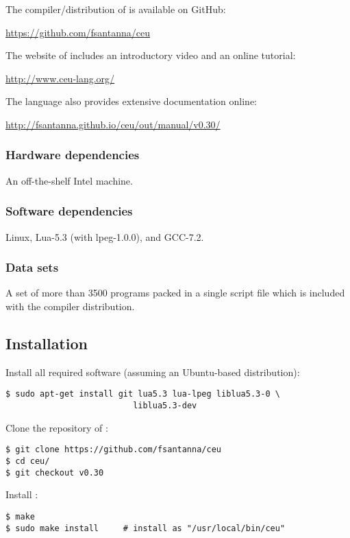 {The compiler/distribution of \CEU is available on GitHub:

\url{https://github.com/fsantanna/ceu}

The website of \CEU includes an introductory video and an online tutorial:

\url{http://www.ceu-lang.org/}

The language also provides extensive documentation online:

\url{http://fsantanna.github.io/ceu/out/manual/v0.30/}

\subsubsection{Hardware dependencies}

An off-the-shelf Intel machine.

\subsubsection{Software dependencies}

Linux, Lua-5.3 (with lpeg-1.0.0), and GCC-7.2.

\subsubsection{Data sets}

A set of more than 3500 programs packed in a single script file which is
included with the compiler distribution.

\subsection{Installation}

Install all required software (assuming an Ubuntu-based distribution):

\begin{verbatim}
$ sudo apt-get install git lua5.3 lua-lpeg liblua5.3-0 \
                          liblua5.3-dev
\end{verbatim}

Clone the repository of \CEU:

\begin{verbatim}
$ git clone https://github.com/fsantanna/ceu
$ cd ceu/
$ git checkout v0.30
\end{verbatim}

Install \CEU:

\begin{verbatim}
$ make
$ sudo make install     # install as "/usr/local/bin/ceu"
\end{verbatim}

}
